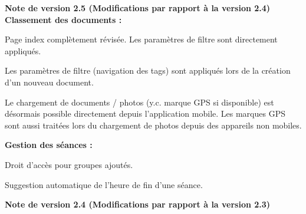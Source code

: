 \vspace{\baselineskip}

\textbf{Note de version 2.5 (Modifications par rapport à la version 2.4)} \\
\textbf{Classement des documents :}
\begin{compactitem}
  \item Page index complètement révisée. Les paramètres de filtre sont directement appliqués.
	\item Les paramètres de filtre (navigation des tags) sont appliqués lors de la création d'un nouveau document.
	\item Le chargement de documents / photos (y.c. marque GPS si disponible) est désormais possible directement depuis l'application mobile. Les marques GPS sont aussi traitées lors du chargement de photos depuis des appareils non mobiles.
\end{compactitem}
\textbf{Gestion des séances :}
\begin{compactitem}
  \item Droit d'accès pour groupes ajoutés.
	\item Suggestion automatique de l'heure de fin d'une séance.
\end{compactitem}

\vspace{\baselineskip}


\textbf{Note de version 2.4 (Modifications par rapport à la version 2.3)} \\

